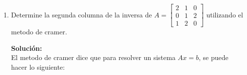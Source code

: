 \documentclass[12pt]{article}
\newenvironment{solucion}
{\begin{mdframed}[backgroundcolor=black!10]
		{\bf Solución:}\\
	}
	{
	\end{mdframed}
}
\newenvironment{preguntas}
{\begin{enumerate}\itemsep12pt
	}
	{
	\end{enumerate}
}
\newcommand{\ra}{\rightarrow}
\newcommand{\R}{\mathbb{R}}
\begin{document}
\begin{preguntas}
\begin{solucion}
Para que el determinante sea 0, las columnas de $A$ deben ser $LD$, es decir, debe existir $\alpha_1, \alpha_2, \alpha_3, \alpha_4 \in \R$ no todos iguales a 0, tal que
$$\alpha_1(v_1-v_3+v_4) + \alpha_2(-v_2-v_3) +\alpha_3(v_3-v_1) + \alpha_4(v_1+v_2+2v_4) = 0$$
Una forma sencilla de demostrar que existe alguna combinación de valores no triviales que cumpla con esto, es buscar una en particular. Para esto diremos de manera arbitraria que $\alpha_4 = -1$ y buscaremos los otros. Con esto, obtenemos
$$\alpha_1(v_1-v_3+v_4) + \alpha_2(-v_2-v_3) +\alpha_3(v_3-v_1) =v_1+v_2+2v_4$$
Notemos que esto equivale a encontrar una combinación lineal de las 3 primeras columnas para formar la cuarta. Reordenando,
$$(\alpha_1 - \alpha_3)v_1 -\alpha_2 v_2 + (-\alpha_1 - \alpha_2 + \alpha_3)v_3 + \alpha_1 v_4 =v_1+v_2+2v_4$$
De aquí, obtenemos el sistema
$$\begin{array}{rcl}
\alpha_1 - \alpha_3 & = & 1\\
-\alpha_2 & = & 1\\
-\alpha_1 - \alpha_2 + \alpha_3 & = & 0\\
\alpha_1 & = & 2
\end{array} \ra
\begin{array}{rcl}
\alpha_1 & = & 2\\
\alpha_2 & = & -1\\
\alpha_3 & = & 1\\
\alpha_4 & = & -1
\end{array}
$$
Que corresponde a una solución no trivial, por lo que las columnas de $A$ son $LD$.\\

En conclusión, el determinante de $A$ es 0.
\end{solucion}
\item Determine la segunda columna de la inversa de $A = \left[ \begin{array}{rrr} 2&1&0\\ 0&1&2\\ 1&2&0 \end{array} \right]$ utilizando el metodo de cramer.
\begin{solucion}
El metodo de cramer dice que para resolver un sistema $Ax = b$, se puede hacer lo siguiente:\\


\end{solucion}
\end{preguntas}
\end{document}
